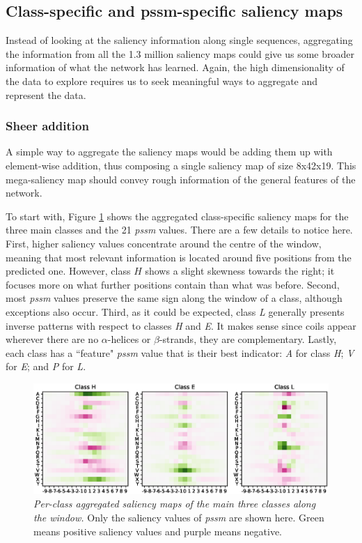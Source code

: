 
\subsection{Class-specific and pssm-specific saliency maps}
Instead of looking at the saliency information along single sequences, aggregating the information from all the 1.3 million saliency maps could give us some broader information of what the network has learned. Again, the high dimensionality of the data to explore requires us to seek meaningful ways to aggregate and represent the data.

\subsubsection*{Sheer addition} \label{sect:sheer}
A simple way to aggregate the saliency maps would be adding them up with element-wise addition, thus composing a single saliency map of size 8x42x19. This mega-saliency map should convey rough information of the general features of the network.

To start with, Figure \ref{fig:class_agg_class} shows the aggregated class-specific saliency maps for the three main classes and the 21 \textit{pssm} values. There are a few details to notice here. First, higher saliency values concentrate around the centre of the window, meaning that most relevant information is located around five positions from the predicted one. However, class $H$ shows a slight skewness towards the right; it focuses more on what further positions contain than what was before. Second, most \textit{pssm} values preserve the same sign along the window of a class, although exceptions also occur. Third, as it could be expected, class \textit{L} generally presents inverse patterns with respect to classes \textit{H} and \textit{E}. It makes sense since coils appear wherever there are no $\alpha$-helices or $\beta$-strands, they are complementary. Lastly, each class has a ``feature" \textit{pssm} value that is their best indicator: \textit{A} for class \textit{H}; \textit{V} for \textit{E}; and \textit{P} for \textit{L}.

\begin{figure}
	\centering
	\includegraphics[width=1\linewidth]{Figures/class_agg_class}
	\caption{\textit{Per-class aggregated saliency maps of the main three classes along the window.} Only the saliency values of \textit{pssm} are shown here. Green means positive saliency values and purple means negative.}
	\label{fig:class_agg_class}
\end{figure}

